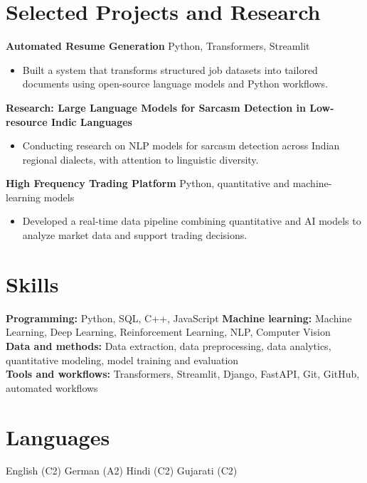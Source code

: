 \documentclass[a4paper,9pt]{article}
\begin{document}
\section*{Selected Projects and Research}
\textbf{Automated Resume Generation} \hfill Python, Transformers, Streamlit
\begin{itemize}
 \item Built a system that transforms structured job datasets into tailored documents using open-source language models and Python workflows.
\end{itemize}
\textbf{Research: Large Language Models for Sarcasm Detection in Low-resource Indic Languages}
\begin{itemize}
 \item Conducting research on NLP models for sarcasm detection across Indian regional dialects, with attention to linguistic diversity.
\end{itemize}
\textbf{High Frequency Trading Platform} \hfill Python, quantitative and machine-learning models
\begin{itemize}
 \item Developed a real-time data pipeline combining quantitative and AI models to analyze market data and support trading decisions.
\end{itemize}
\section*{Skills}
\textbf{Programming:} Python, SQL, C++, JavaScript \quad
\textbf{Machine learning:} Machine Learning, Deep Learning, Reinforcement Learning, NLP, Computer Vision\\
\textbf{Data and methods:} Data extraction, data preprocessing, data analytics, quantitative modeling, model training and evaluation\\
\textbf{Tools and workflows:} Transformers, Streamlit, Django, FastAPI, Git, GitHub, automated workflows
\section*{Languages}
English (C2) \quad German (A2) \quad Hindi (C2) \quad Gujarati (C2)
\end{document}
